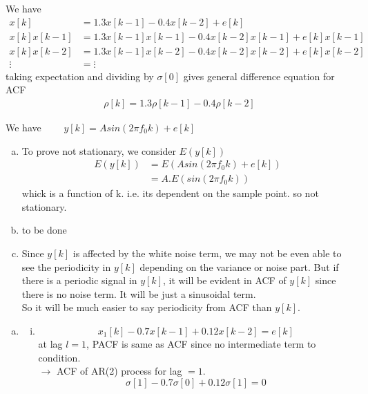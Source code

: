 \documentclass[11pt,paper=a4,answers]{exam}
\begin{document}
\begin{questions}
\begin{enumerate}[(a)]
    We have
    \begin{align}
        x[k] &= 1.3x[k-1] - 0.4x[k-2] + e[k] \nonumber \\
        x[k]x[k-1] &= 1.3x[k-1]x[k-1] - 0.4x[k-2]x[k-1] + e[k]x[k-1] \nonumber \\
        x[k]x[k-2] &= 1.3x[k-1]x[k-2] - 0.4x[k-2]x[k-2] + e[k]x[k-2] \nonumber \\
        \vdots &= \vdots \nonumber
    \end{align}
    taking expectation and dividing by $\sigma[0]$ gives general difference equation for ACF
    \begin{align}
        \rho[k] = 1.3\rho[k-1] - 0.4\rho[k-2] \nonumber
    \end{align}
\end{enumerate}
\question
We have $\qquad y[k] = Asin(2\pi f_0 k) + e[k]$\\
\begin{enumerate}[(a)]
    \item To prove not stationary, we consider $E(y[k])$ \\
    \begin{align}
        E(y[k]) &= E(Asin(2\pi f_0 k) + e[k]) \nonumber \\
        &= A.E(sin(2\pi f_0 k)) \nonumber
    \end{align}
    whick is a function of k. i.e. its dependent on the sample point. so not stationary.
    \item
    to be done
    \item Since $y[k]$ is affected by the white noise term, we may not be even able to see the periodicity in $y[k]$ depending on the variance or noise part. But if there is a periodic signal in $y[k]$, it will be evident in ACF of $y[k]$ since there is no noise term. It  will be just a sinusoidal term.\\
    So it will be much easier to say periodicity from ACF than $y[k]$.
\end{enumerate}
\question
\begin{enumerate}[(a)]
    \item \begin{enumerate}[(i)]
        \item $$x_1 [k] - 0.7x[k - 1] + 0.12x[k - 2] = e[k]$$
        at lag $l = 1$, PACF is same as ACF since no intermediate term to condition.\\
        $\longrightarrow$ ACF of AR(2) process for lag $=1$.\\
        $$\sigma [1] - 0.7 \sigma[0] + 0.12 \sigma [1] = 0$$

\end{enumerate}
\end{enumerate}
\end{questions}
\end{document}
